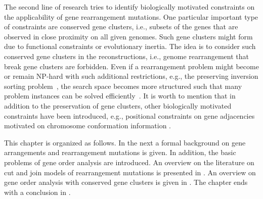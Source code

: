 \documentclass{svmult}
\begin{document}
The second line of research tries to identify biologically motivated constraints 
on the applicability of gene rearrangement mutations. One particular important
type of constraints are conserved gene clusters, i.e., subsets of the genes that are observed in close proximity on all given genomes. 
Such gene clusters might form due to functional constraints or evolutionary inertia. The idea is to consider such
conserved gene clusters in the reconstructions, i.e., genome rearrangement that break gene clusters are forbidden. 
Even if a rearrangement problem might become or remain NP-hard with such additional restrictions, e.g., the preserving 
inversion sorting problem~\cite{Figeac_2004}, the search space becomes more structured such that many problem instances 
can be solved efficiently~\cite{Berard_2007,Bernt_2009,Bernt_2007}.
It is worth to mention that in addition to the preservation of gene
clusters, other biologically motivated constraints have been introduced, e.g., positional constraints on gene 
adjacencies motivated on chromosome conformation information
\cite{Swenson_2016, Veron_2011}.


This chapter is organized as follows. In the next  a formal
background on gene arrangements and rearrangement mutations is given. In addition, the basic problems of gene order analysis are 
introduced. An overview on the literature on cut and join models of rearrangement mutations is presented in . 
An overview on gene order analysis with conserved gene clusters is given in . 
The chapter ends with a conclusion in .
\end{document}
